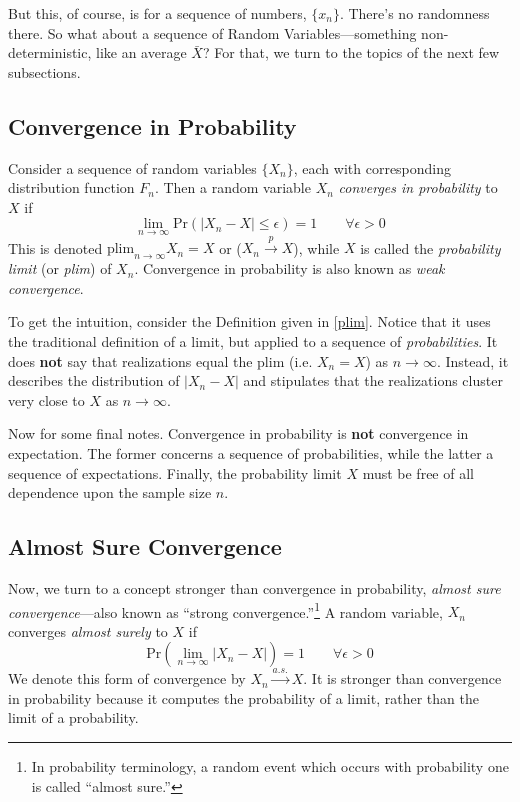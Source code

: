 \documentclass[a4paper,12pt]{scrartcl}
\begin{document}
But this, of course, is for a sequence of numbers, $\{x_n\}$.
There's no randomness there.  So what about a sequence of 
Random Variables---something non-deterministic, like an 
average $\bar{X}$? For that, 
we turn to the topics of the next few subsections.

\newpage
\subsection{Convergence in Probability}

Consider a sequence of random variables $\{ X_n \}$, 
each with corresponding distribution function $F_n$.
Then a random variable $X_n$ \emph{converges in probability}
to $X$ if
\begin{equation}
    \label{plim}
    \lim_{n\rightarrow\infty} \text{Pr}\left(\left\lvert X_n
	- X \right\rvert \leq \epsilon \right) = 1
    \qquad \forall \epsilon > 0
\end{equation}
This is denoted $\text{plim}_{n\rightarrow\infty} X_n = X$ or
($X_n\overset{p}{\to}X$),
while $X$ is called the \emph{probability limit} (or \emph{plim})
of $X_n$. Convergence in probability is also known as 
\emph{weak convergence}.

To get the intuition, consider the Definition given in 
\ref{plim}. Notice that it uses the traditional definition
of a limit, but applied to a sequence of 
\emph{probabilities}.  It does \textbf{not} say that 
realizations equal the plim (i.e. $X_n = X$)
as $n\rightarrow\infty$. Instead, it describes the distribution
of $|X_n - X|$ and stipulates that the realizations
cluster very close to $X$ as $n\rightarrow\infty$.

Now for some final notes. Convergence in probability
is \textbf{not} convergence in expectation. The former
concerns a sequence of probabilities, while the latter a
sequence of expectations. Finally, the probability limit
$X$ must be free of all dependence upon the sample size $n$.

\subsection{Almost Sure Convergence}

Now, we turn to a concept stronger
than convergence in probability, \emph{almost sure
convergence}---also known as ``strong
convergence.''\footnote{In probability terminology, 
a random event which occurs
with probability one is called ``almost sure.''}
A random variable, $X_n$ converges \emph{almost surely}
to $X$ if
\begin{equation}
    \label{almsure}
    \text{Pr}\left(\lim_{n\rightarrow \infty}
	\left\lvert X_n - X \right\rvert \right) = 1
    \qquad \forall \epsilon > 0
\end{equation}
We denote this form of convergence by 
$X_n\overset{a.s.}{\to}X$. It is stronger than 
convergence in probability because it computes the probability
of a limit, rather than the limit of a probability.
\end{document}
